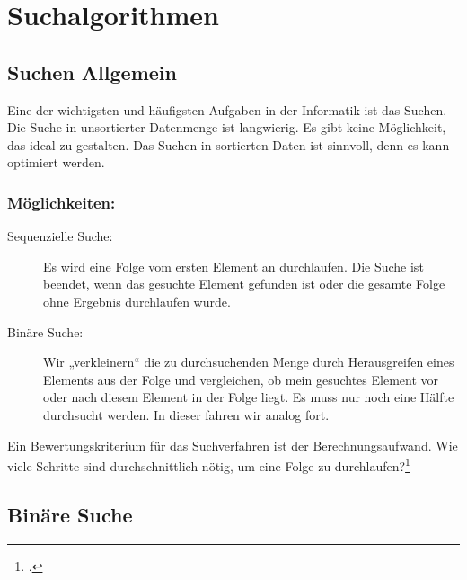 \documentclass{lehramt-informatik}
\begin{document}

\chapter{Suchalgorithmen}

%

\section{Suchen Allgemein}

Eine der wichtigsten und häufigsten Aufgaben in der Informatik ist das
Suchen.
%
Die Suche in unsortierter Datenmenge ist langwierig. Es gibt keine
Möglichkeit, das ideal zu gestalten.
%
Das Suchen in sortierten Daten ist sinnvoll, denn es kann optimiert
werden.

\subsection{Möglichkeiten:}

\begin{description}
\item[Sequenzielle Suche:] Es wird eine Folge vom ersten Element an
durchlaufen. Die Suche ist beendet, wenn das gesuchte Element gefunden
ist oder die gesamte Folge ohne Ergebnis durchlaufen wurde.

\item[Binäre Suche:] Wir „verkleinern“ die zu durchsuchenden Menge durch
Herausgreifen eines Elements aus der Folge und vergleichen, ob mein
gesuchtes Element vor oder nach diesem Element in der Folge liegt. Es
muss nur noch eine Hälfte durchsucht werden. In dieser fahren wir analog
fort.
\end{description}

Ein Bewertungskriterium für das Suchverfahren ist der
Berechnungsaufwand. Wie viele Schritte sind durchschnittlich nötig, um
eine Folge zu durchlaufen?\footcite[Seite 16 (PDF 8)]{aud:fs:2}

%

\section{Binäre Suche}
\end{document}
